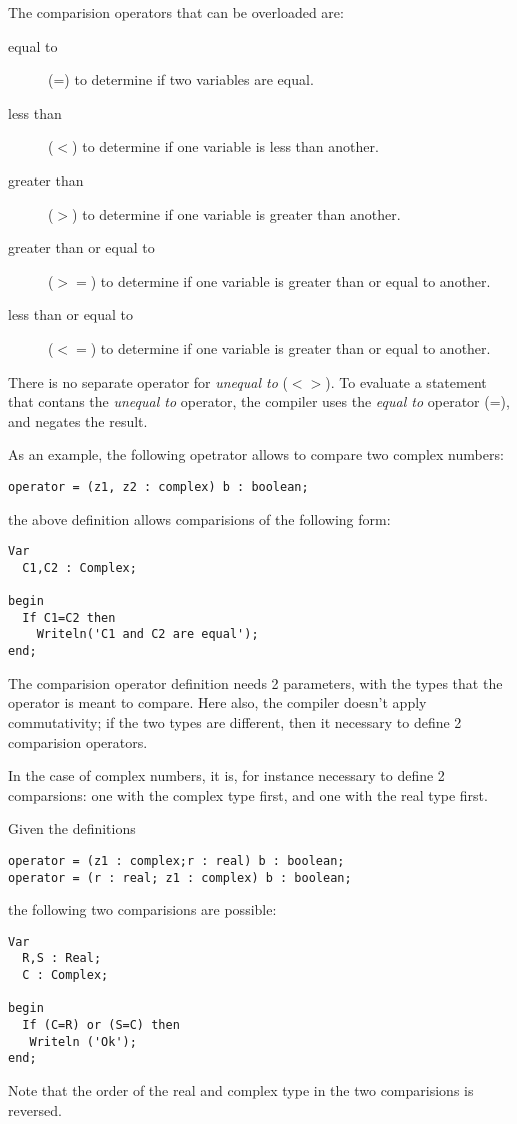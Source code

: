 \documentclass{report}
\begin{document}
The comparision operators that can be overloaded are:
\begin{description}
\item[equal to] (=) to determine if two variables are equal.
\item[less than] ($<$) to determine if one variable is less than another.
\item[greater than] ($>$) to determine if one variable is greater than another.
\item[greater than or equal to] ($>=$) to determine if one variable is greater than
or equal to another.
\item[less than or equal to] ($<=$) to determine if one variable is greater 
than or equal to another.
\end{description}
There is no separate operator for {\em unequal to} ($<>$). To evaluate a
statement that contans the {\em unequal to} operator, the compiler uses the 
{\em equal to} operator (=), and negates the result.


As an example, the following opetrator allows to compare two complex
numbers:
\begin{verbatim}
operator = (z1, z2 : complex) b : boolean;
\end{verbatim}
the above definition allows comparisions of the following form:
\begin{verbatim}
Var
  C1,C2 : Complex;

begin
  If C1=C2 then
    Writeln('C1 and C2 are equal');
end;
\end{verbatim}

The comparision operator definition needs 2 parameters, with the types that
the operator is meant to compare. Here also, the compiler doesn't apply
commutativity; if the two types are different, then it necessary to
define 2 comparision operators. 

In the case of complex numbers, it is, for instance necessary to define
2 comparsions: one with the complex type first, and one with the real type
first.

Given the definitions
\begin{verbatim}
operator = (z1 : complex;r : real) b : boolean;
operator = (r : real; z1 : complex) b : boolean;
\end{verbatim}
the following two comparisions are possible:
\begin{verbatim}
Var 
  R,S : Real;
  C : Complex;

begin
  If (C=R) or (S=C) then
   Writeln ('Ok');
end;
\end{verbatim}
Note that the order of the real and complex type in the two comparisions 
is reversed.
\end{document}
